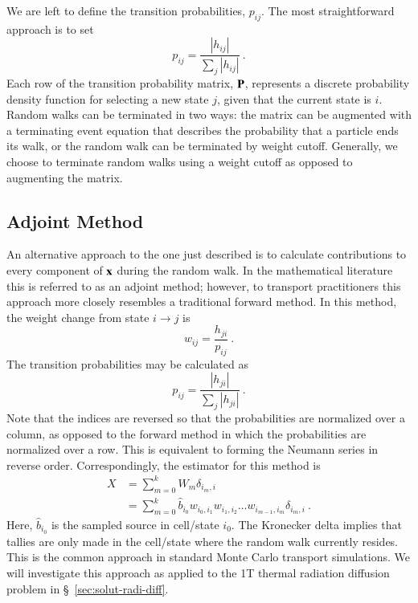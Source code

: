 \documentclass[preprint,12pt]{elsarticle}
\newcommand{\vx}{\ensuremath{\ve{x}}}
\newcommand{\vP}{\ensuremath{\ve{P}}}
\begin{document}
We are left to define the transition probabilities, $p_{ij}$. The most
straightforward approach is to set
\begin{equation}
  p_{ij} = \frac{|h_{ij}|}{\sum_{j}|h_{ij}|}\:.
  \label{eq:probability}
\end{equation}
Each row of the transition probability matrix, $\vP$, represents a
discrete probability density function for selecting a new state $j$,
given that the current state is $i$.  Random walks can be terminated
in two ways: the matrix can be augmented with a terminating event
equation that describes the probability that a particle ends its walk,
or the random walk can be terminated by weight cutoff.  Generally, we
choose to terminate random walks using a weight cutoff as opposed to
augmenting the matrix.

\subsection{Adjoint Method}
\label{sec:adjoint-method}

An alternative approach to the one just described is to calculate
contributions to every component of $\vx$ during the random walk.  In
the mathematical literature this is referred to as an adjoint method;
however, to transport practitioners this approach more closely
resembles a traditional forward method.  In this method, the weight
change from state $i\rightarrow j$ is
\begin{equation}
  w_{ij} = \frac{h_{ji}}{p_{ij}}\:.
  \label{eq:adjoint-weight}
\end{equation}
The transition probabilities may be calculated as
\begin{equation}
  p_{ij} = \frac{|h_{ji}|}{\sum_{j}|h_{ji}|}\:.
  \label{eq:adjoint-probability}
\end{equation}
Note that the indices are reversed so that the probabilities are
normalized over a column, as opposed to the forward method in which
the probabilities are normalized over a row.  This is equivalent to
forming the Neumann series in reverse order.  Correspondingly, the
estimator for this method is
\begin{equation}
  \begin{split}
    X &= \sum_{m=0}^{k}W_m\delta_{i_m,i}\\
    &= \sum_{m=0}^{k}\hat{b}_{i_0}w_{i_0,i_1}w_{i_1,i_2}\ldots
                                  w_{i_{m-1},i_m}\delta_{i_m,i}\:.
  \end{split}
  \label{eq:adjoint-tally}
\end{equation}
Here, $\hat{b}_{i_0}$ is the sampled source in cell/state $i_0$.  The
Kronecker delta implies that tallies are only made in the cell/state
where the random walk currently resides.  This is the common approach
in standard Monte Carlo transport simulations.  We will investigate
this approach as applied to the 1T thermal radiation diffusion
problem in \S~\ref{sec:solut-radi-diff}.
\end{document}
